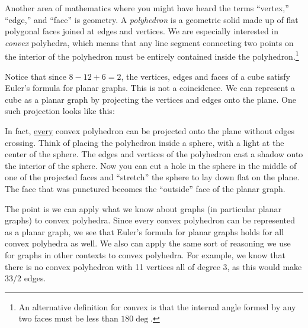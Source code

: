 \documentclass[12pt]{article}
\begin{document}
Another area of mathematics where you might have heard the terms ``vertex,'' ``edge,'' and ``face'' is geometry.  A \emph{polyhedron} is a geometric solid made up of flat polygonal faces joined at edges and vertices.  We are especially interested in \emph{convex} polyhedra, which means that any line segment connecting two points on the interior of the polyhedron must be entirely contained inside the polyhedron.\footnote{An alternative definition for convex is that the internal angle formed by any two faces must be less than $180\deg$.}


Notice that since $8 - 12 + 6 = 2$, the vertices, edges and faces of a cube satisfy Euler's formula for planar graphs.  This is not a coincidence.  We can represent a cube as a planar graph by projecting the vertices and edges onto the plane.  One such projection looks like this:

\begin{center}
\end{center}

In fact, \underline{every} convex polyhedron can be projected onto the plane without edges crossing.  Think of placing the polyhedron inside a sphere, with a light at the center of the sphere.  The edges and vertices of the polyhedron cast a shadow onto the interior of the sphere.  Now you can cut a hole in the sphere in the middle of one of the projected faces and ``stretch'' the sphere to lay down flat on the plane.  The face that was punctured becomes the ``outside'' face of the planar graph.

The point is we can apply what we know about graphs (in particular planar graphs) to convex polyhedra.  Since every convex polyhedron can be represented as a planar graph, we see that Euler's formula for planar graphs holds for all convex polyhedra as well.  We also can apply the same sort of reasoning we use for graphs in other contexts to convex polyhedra.  For example, we know that there is no convex polyhedron with 11 vertices all of degree 3, as this would make 33/2 edges.
\end{document}
